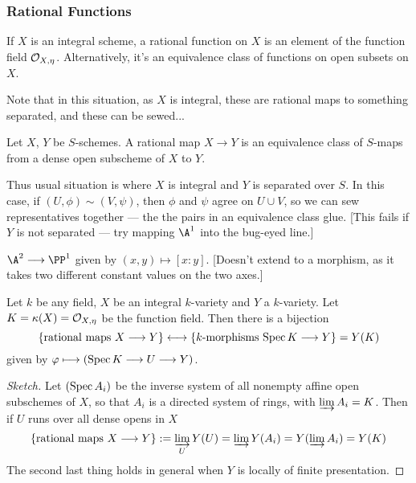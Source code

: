 \documentclass[11pt]{article}
\begin{document}
\begin{Oct18}
\subsubsection*{Rational Functions}
\begin{defn*} If $X$ is an integral scheme, a rational function on $X$ is an element of the function field $\calO_{X,\eta}$. Alternatively, it's an equivalence class of functions on open subsets on $X$.
\end{defn*}
\noindent Note that in this situation, as $X$ is integral, these are rational maps to something separated, and these can be sewed...
\begin{defn*} Let $X$, $Y$ be $S$-schemes. A rational map $X\to Y$ is an equivalence class of $S$-maps from a dense open subscheme of $X$ to $Y$.
\end{defn*}
Thus usual situation is where $X$ is integral and $Y$ is separated over $S$. In this case, if $(U,\phi)\sim(V,\psi)$, then $\phi$ and $\psi$ agree on $U\cup V$, so we can sew representatives together --- the the pairs in an equivalence class glue. [This fails if $Y$ is not separated --- try mapping $\A^1$ into the bug-eyed line.]
\begin{exmp*}
$\A^2\to\PP^1$ given by $(x,y)\mapsto [x:y]$. [Doesn't extend to a morphism, as it takes two different constant values on the two axes.]
\end{exmp*}
\begin{prop*}
Let $k$ be any field, $X$ be an integral $k$-variety and $Y$ a $k$-variety. Let $K=\kappa(X)=\calO_{X,\eta}$ be the function field. Then there is a bijection
\[\{\text{rational maps $X\to Y$}\}\longleftrightarrow\{\text{$k$-morphisms $\Spec K\to Y$}\}=Y(K)\]
given by $\phi\mapsto (\spec K\to U\to Y)$.
\end{prop*}
\begin{proof}[Sketch]
Let $(\spec A_i)$ be the inverse system of all nonempty affine open subschemes of $X$, so that $A_i$ is a directed system of rings, with $\varinjlim A_i=K$. Then if $U$ runs over all dense opens in $X$
\[\{\text{rational maps $X\to Y$}\}:=\varinjlim_U Y(U)=\varinjlim Y(A_i)= Y(\varinjlim A_i)=Y(K)\]
The second last thing holds in general when $Y$ is locally of finite presentation.


\end{proof}
\end{Oct18}
\end{document}
